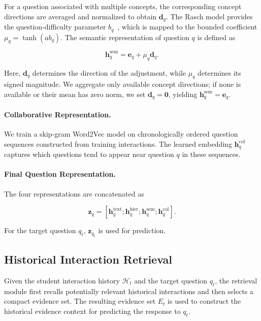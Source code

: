 \documentclass{llncs}
\begin{document}
For a question associated with multiple concepts, the corresponding concept directions are averaged and normalized to obtain \(\mathbf{d}_q\). The Rasch model provides the question-difficulty parameter \(b_q\)~\cite{rasch1960}, which is mapped to the bounded coefficient \(\mu_q=\tanh(a b_q)\). The semantic representation of question \(q\) is defined as

\begin{equation}
\mathbf{h}_q^{\mathrm{sem}}
=
\mathbf{e}_q+\mu_q\mathbf{d}_q.
\end{equation}

Here, \(\mathbf{d}_q\) determines the direction of the adjustment, while \(\mu_q\) determines its signed magnitude. We aggregate only available concept directions; if none is available or their mean has zero norm, we set $\mathbf d_q=\mathbf0$, yielding $\mathbf h_q^{\mathrm{sem}}=\mathbf e_q$.

\paragraph{Collaborative Representation.}

We train a skip-gram Word2Vec model on chronologically ordered question sequences constructed from training interactions. The learned embedding $\mathbf h_q^{\mathrm{col}}$ captures which questions tend to appear near question $q$ in these sequences.

\paragraph{Final Question Representation.}

The four representations are concatenated as

\begin{equation}
\mathbf{z}_q
=
\left[
\mathbf{h}_q^{\mathrm{text}};
\mathbf{h}_q^{\mathrm{hier}};
\mathbf{h}_q^{\mathrm{sem}};
\mathbf{h}_q^{\mathrm{col}}
\right].
\end{equation}

For the target question \(q_t\), \(\mathbf{z}_{q_t}\) is used for prediction.

\subsection{Historical Interaction Retrieval}

Given the student interaction history \(\mathcal{H}_t\) and the target question \(q_t\), the retrieval module first recalls potentially relevant historical interactions and then selects a compact evidence set. The resulting evidence set \(E_t\) is used to construct the historical evidence context for predicting the response to \(q_t\).
\end{document}
